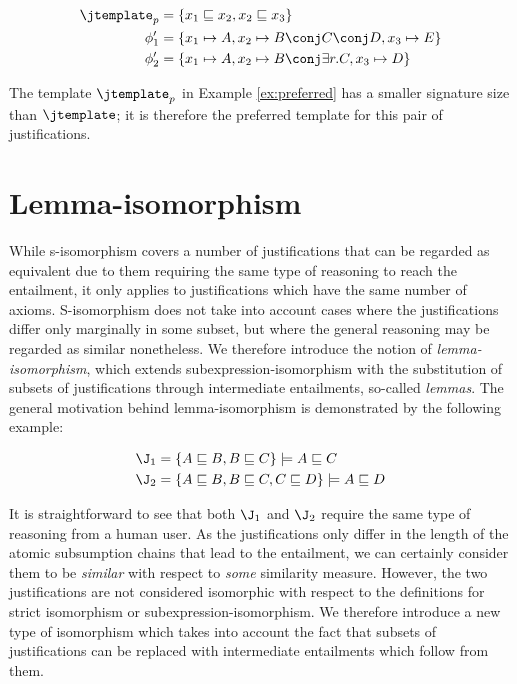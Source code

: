 \begin{examp}
\begin{align*}
\jtemplate_{p}   &=  \{x_{1} \sqsubseteq x_{2}, x_{2} \sqsubseteq x_{3} \}  \\ 
\phi_{1}'  &=  \{ x_{1} \mapsto A, x_{2} \mapsto B\conj C\conj D, x_{3} \mapsto E\}\\
\phi_{2}'  &= \{ x_{1} \mapsto A, x_{2} \mapsto B \conj \exists r.C, x_{3} \mapsto D\}
\end{align*}\label{ex:preferred}
\end{examp}
The template $\jtemplate_{p}$ in Example \ref{ex:preferred} has a smaller signature size than $\jtemplate$; it is therefore the preferred template for this pair of justifications. 


\section{Lemma-isomorphism}

While s-isomorphism covers a number of justifications that can be regarded as equivalent due to them requiring the same type of reasoning to reach the entailment, it only applies to justifications which have the same number of axioms. S-isomorphism does not take into account cases where the justifications differ only marginally in some subset, but where the general reasoning may be regarded as similar nonetheless. We therefore introduce the notion of \emph{lemma-isomorphism}, which extends subexpression-isomorphism with the substitution of subsets of justifications through intermediate entailments, so-called \emph{lemmas}. The general motivation behind lemma-isomorphism is demonstrated by the following example:
\begin{examp}
\begin{align*}
\J_{1} &=  \{ A \sqsubseteq B, B \sqsubseteq C\} \models A \sqsubseteq C\\ 
\J_{2} &= \{ A \sqsubseteq B, B \sqsubseteq C, C \sqsubseteq D \}  \models A \sqsubseteq D
\end{align*}
\end{examp}
It is straightforward to see that both $\J_{1}$ and $\J_{2}$ require the same type of reasoning from a human user. As the justifications only differ in the length of the atomic subsumption chains that lead to the entailment, we can certainly consider them to be \emph{similar} with respect to \emph{some} similarity measure. However, the two justifications are not considered isomorphic with respect to the definitions for strict isomorphism or subexpression-isomorphism. We therefore introduce a new type of isomorphism which takes into account the fact that subsets of justifications can be replaced with intermediate entailments which follow from them. 

